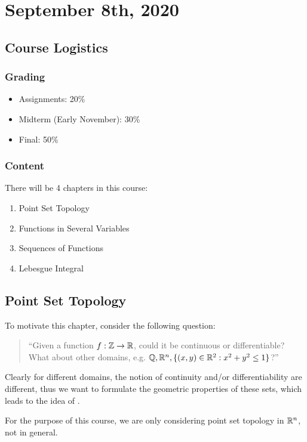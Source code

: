 \documentclass[../main/main.tex]{subfiles}
\begin{document}
\section{September  8th, 2020}
\subsection{Course Logistics}
\subsubsection{Grading}
\begin{itemize}
    \item Assignments: 20\%
    \item Midterm (Early November): 30\%
    \item Final: 50\%
\end{itemize}
\subsubsection{Content} 
There will be 4 chapters in this course: 
\begin{enumerate}
    \item Point Set Topology
    \item Functions in Several Variables
    \item Sequences of Functions
    \item Lebesgue Integral
\end{enumerate}
\subsection{Point Set Topology}

To motivate this chapter, consider the following question:

\begin{quote} 
    ``Given a function $f: \mathbb{Z} \to  \mathbb{R}$, could it be continuous or differentiable? What about other domains, e.g. $\mathbb{Q}, \mathbb{R}^{n}, \{(x,y) \in  \mathbb{R}^2: x^2+y^2\le 1\} $?''
\end{quote}

Clearly for different domains, the notion of continuity and/or differentiability are different, thus we want to formulate the geometric properties of these sets, which leads to the idea of .

\begin{remark}
    For the purpose of this course, we are only considering point set topology in $ \mathbb{R}^{n}$, not in general.
\end{remark}
\end{document}
